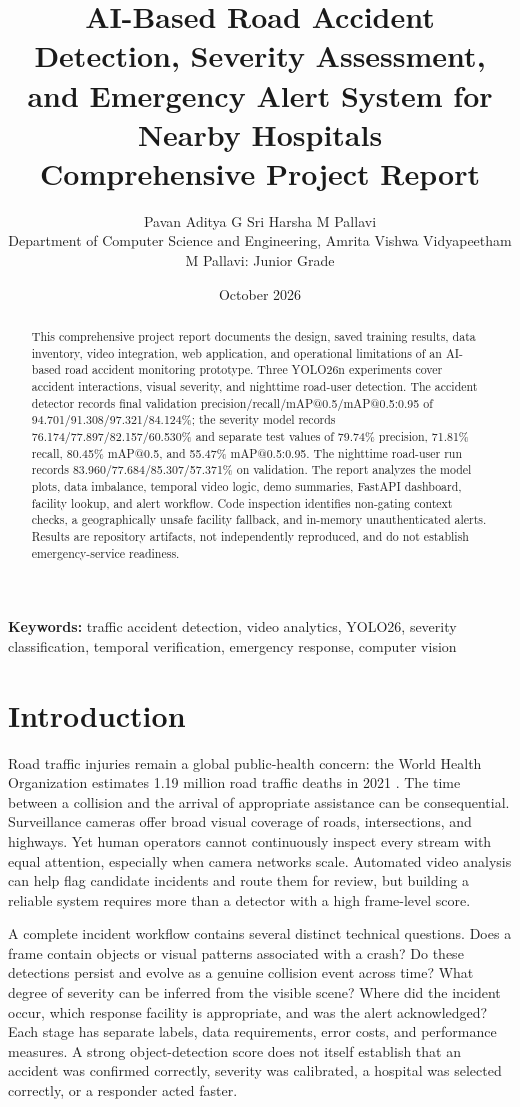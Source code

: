 \documentclass[12pt,a4paper]{article}
\title{AI-Based Road Accident Detection, Severity Assessment, and Emergency Alert System for Nearby Hospitals\\[0.4em]\large Comprehensive Project Report}
\author{Pavan Aditya \quad G Sri Harsha \quad M Pallavi\\[0.35em]
\small Department of Computer Science and Engineering, Amrita Vishwa Vidyapeetham\\
\small M Pallavi: Junior Grade}
\date{October 2026}
\begin{document}
\maketitle
\begin{abstract}
This comprehensive project report documents the design, saved training results, data inventory, video integration, web application, and operational limitations of an AI-based road accident monitoring prototype. Three YOLO26n experiments cover accident interactions, visual severity, and nighttime road-user detection. The accident detector records final validation precision/recall/mAP@0.5/mAP@0.5:0.95 of 94.701/91.308/97.321/84.124\%; the severity model records 76.174/77.897/82.157/60.530\% and separate test values of 79.74\% precision, 71.81\% recall, 80.45\% mAP@0.5, and 55.47\% mAP@0.5:0.95. The nighttime road-user run records 83.960/77.684/85.307/57.371\% on validation. The report analyzes the model plots, data imbalance, temporal video logic, demo summaries, FastAPI dashboard, facility lookup, and alert workflow. Code inspection identifies non-gating context checks, a geographically unsafe facility fallback, and in-memory unauthenticated alerts. Results are repository artifacts, not independently reproduced, and do not establish emergency-service readiness.
\end{abstract}
\clearpage
\tableofcontents
\clearpage
\listoffigures
\clearpage
\listoftables
\clearpage
{}
\noindent\textbf{Keywords:} 
traffic accident detection, video analytics, YOLO26, severity classification, temporal verification, emergency response, computer vision


\section{Introduction}
Road traffic injuries remain a global public-health concern: the World Health Organization estimates 1.19 million road traffic deaths in 2021 \cite{who2023}. The time between a collision and the arrival of appropriate assistance can be consequential. Surveillance cameras offer broad visual coverage of roads, intersections, and highways. Yet human operators cannot continuously inspect every stream with equal attention, especially when camera networks scale. Automated video analysis can help flag candidate incidents and route them for review, but building a reliable system requires more than a detector with a high frame-level score.

A complete incident workflow contains several distinct technical questions. Does a frame contain objects or visual patterns associated with a crash? Do these detections persist and evolve as a genuine collision event across time? What degree of severity can be inferred from the visible scene? Where did the incident occur, which response facility is appropriate, and was the alert acknowledged? Each stage has separate labels, data requirements, error costs, and performance measures. A strong object-detection score does not itself establish that an accident was confirmed correctly, severity was calibrated, a hospital was selected correctly, or a responder acted faster.
\end{document}
